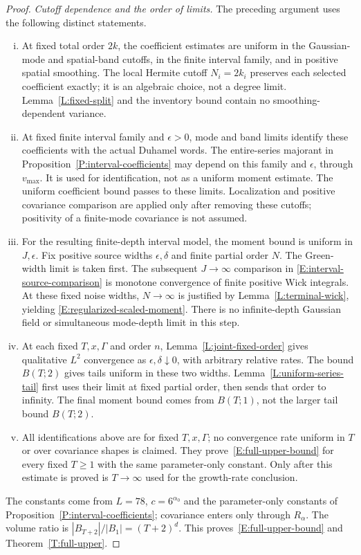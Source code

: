 \documentclass[12pt]{article}
\numberwithin{equation}{section}
\theoremstyle{definition}
\begin{document}
\begin{proof}
  \emph{Cutoff dependence and the order of limits.}
  The preceding argument uses the following distinct statements.
  \begin{enumerate}[(i)]
    \item At fixed total order $2k$, the coefficient estimates are uniform
      in the Gaussian-mode and spatial-band cutoffs, in the finite interval
      family, and in positive spatial smoothing. The local Hermite cutoff
      $N_i=2k_i$ preserves each selected coefficient exactly; it is an
      algebraic choice, not a degree limit. Lemma~\ref{L:fixed-split} and
      the inventory bound contain no smoothing-dependent variance.
    \item At fixed finite interval family and $\epsilon>0$, mode and band
      limits identify these coefficients with the actual Duhamel words.
      The entire-series majorant in Proposition~\ref{P:interval-coefficients}
      may depend on this family and $\epsilon$, through $v_{\max}$.
      It is used for identification, not as a uniform moment estimate.
      The uniform coefficient bound passes to these limits. Localization
      and positive covariance comparison are applied only after removing
      these cutoffs; positivity of a finite-mode covariance is not assumed.
    \item For the resulting finite-depth interval model, the moment bound
      is uniform in $J,\epsilon$. Fix positive source widths
      $\epsilon,\delta$ and finite partial order $N$. The Green-width limit
      is taken first. The subsequent $J\to\infty$ comparison in
      \eqref{E:interval-source-comparison} is monotone convergence of finite
      positive Wick integrals. At these fixed noise widths,
      $N\to\infty$ is justified by Lemma~\ref{L:terminal-wick}, yielding
      \eqref{E:regularized-scaled-moment}. There is no infinite-depth
      Gaussian field or simultaneous mode-depth limit in this step.
    \item At each fixed $T,x,\Gamma$ and order $n$,
      Lemma~\ref{L:joint-fixed-order} gives qualitative $L^2$ convergence as
      $\epsilon,\delta\downarrow0$, with arbitrary relative rates.
      The bound $B(T;2)$ gives tails uniform in these two widths.
      Lemma~\ref{L:uniform-series-tail} first uses their limit at fixed
      partial order, then sends that order to infinity. The final moment
      bound comes from $B(T;1)$, not the larger tail bound $B(T;2)$.
    \item All identifications above are for fixed $T,x,\Gamma$; no
      convergence rate uniform in $T$ or over covariance shapes is claimed.
      They prove~\eqref{E:full-upper-bound} for every fixed $T\ge1$ with
      the same parameter-only constant. Only after this estimate is proved
      is $T\to\infty$ used for the growth-rate conclusion.
  \end{enumerate}
  The constants come from $L=78$, $c=6^{\alpha_0}$ and the parameter-only
  constants of Proposition~\ref{P:interval-coefficients}; covariance enters
  only through $R_\alpha$.
  The volume ratio is $|B_{T+2}|/|B_1|=(T+2)^d$.
  This proves~\eqref{E:full-upper-bound} and
  Theorem~\ref{T:full-upper}.
\end{proof}
\end{document}

